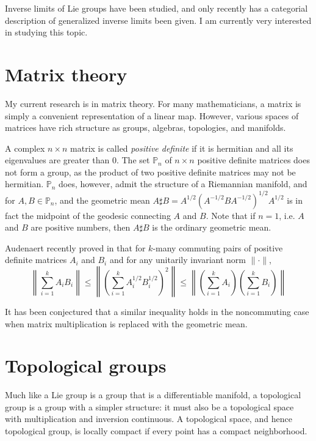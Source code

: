 \documentclass[11pt]{article}
\begin{document}
Inverse limits of Lie groups have been studied, and only recently has a
categorial description of generalized inverse limits been given. I am currently
very interested in studying this topic.

\section{Matrix theory}

My current research is in matrix theory. For many mathematicians, a matrix is
simply a convenient representation of a linear map. However, various spaces of
matrices have rich structure as groups, algebras, topologies, and manifolds.

A complex \( n \times n \)
matrix is called \emph{positive definite} if it is hermitian and all its
eigenvalues are greater than $0$. The set \( \mathbb{P}_n \)
of \( n \times n \)
positive definite matrices does not form a group, as the product of two positive
definite matrices may not be hermitian. \( \mathbb{P}_n \)
does, however, admit the structure of a Riemannian manifold, and for
\( A,B \in \mathbb{P}_n \),
and the geometric mean
\( A \sharp B = A^{1/2}(A^{-1/2}BA^{-1/2})^{1/2}A^{1/2} \)
is in fact the midpoint of the geodesic connecting $A$ and $B$. Note that if \(
n = 1 \), i.e. $A$ and $B$ are positive numbers, then \( A \sharp B \) is the
ordinary geometric mean.

Audenaert recently proved in \cite{aud} that for $k$-many commuting pairs of
positive definite matrices \( A_i \) and \( B_i \) and for any unitarily
invariant norm \( \|\cdot\| \), \[ \left\| \sum_{i=1}^kA_iB_i\right\| \leq
  \left\|\left(\sum_{i=1}^kA_i^{1/2}B_i^{1/2}\right)^2\right\| \leq
  \left\|\left( \sum_{i=1}^kA_i \right)\left( \sum_{i=1}^kB_i\right)\right\| \]

It has been conjectured that a similar inequality holds in the noncommuting case
when matrix multiplication is replaced with the geometric mean.

\section{Topological groups}

Much like a Lie group is a group that is a differentiable manifold, a
topological group is a group with a simpler structure: it must also be a
topological space with multiplication and inversion continuous. A topological
space, and hence topological group, is locally compact if every point has a
compact neighborhood.
\end{document}
